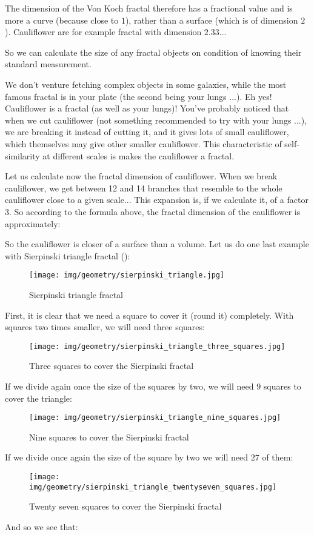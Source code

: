 	The dimension of the Von Koch fractal therefore has a fractional value and is more a curve (because close to $1$), rather than a surface (which is of dimension $2$). Cauliflower are for example fractal with dimension $2.33$...
	
	So we can calculate the size of any fractal objects on condition of knowing their standard measurement.
	
	We don't venture fetching complex objects in some galaxies, while the most famous fractal is in your plate (the second being your lungs ...). Eh yes! Cauliflower is a fractal (as well as your lungs)! You've probably noticed that when we cut cauliflower (not something recommended to try with your lungs ...), we are breaking it instead of cutting it, and it gives lots of small cauliflower, which themselves may give other smaller cauliflower. This characteristic of self-similarity at different scales is makes the cauliflower a fractal.
	
	Let us calculate now the fractal dimension of cauliflower. When we break cauliflower, we get between 12 and 14 branches that resemble to the whole cauliflower close to a given scale... This expansion is, if we calculate it, of a factor 3. So according to the formula above, the fractal dimension of the cauliflower is approximately:
	
	So the cauliflower is closer of a surface than a volume.
	Let us do one last example with Sierpinski triangle fractal ():
	\begin{figure}[H]
		\centering
		\texttt{[image: img/geometry/sierpinski\_triangle.jpg]}
		\caption{Sierpinski triangle fractal}
	\end{figure}
	First, it is clear that we need a square to cover it (round it) completely. With squares two times smaller, we will need three squares:
	\begin{figure}[H]
		\centering
		\texttt{[image: img/geometry/sierpinski\_triangle\_three\_squares.jpg]}
		\caption{Three squares to cover the Sierpinski fractal}
	\end{figure}
	If we divide again once the size of the squares by two, we will need $9$ squares to cover the triangle:
	\begin{figure}[H]
		\centering
		\texttt{[image: img/geometry/sierpinski\_triangle\_nine\_squares.jpg]}
		\caption{Nine squares to cover the Sierpinski fractal}
	\end{figure}
	If we divide once again the size of the square by two we will need $27$ of them:
	\begin{figure}[H]
		\centering
		\texttt{[image: img/geometry/sierpinski\_triangle\_twentyseven\_squares.jpg]}
		\caption{Twenty seven squares to cover the Sierpinski fractal}
	\end{figure}
	And so we see that:
	

